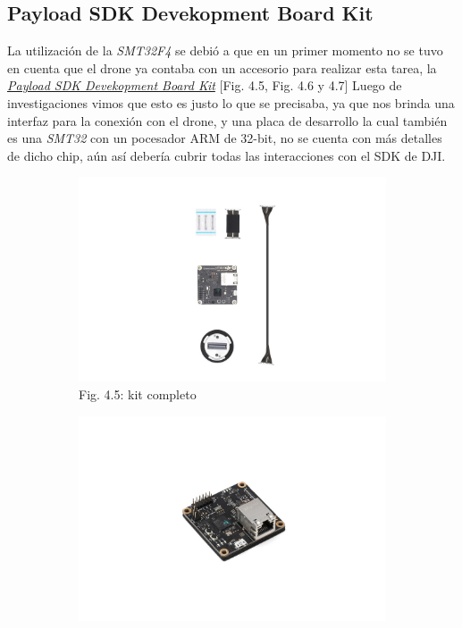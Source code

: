 \documentclass[12pt]{article}
\begin{document}
\subsection*{Payload SDK Devekopment Board Kit}
La utilización de la \textit{SMT32F4} se debió a que en un primer momento no se tuvo en cuenta que el drone ya contaba con un accesorio para realizar esta tarea, la \href{https://store.dji.com/product/psdk-development-kit}{\textit{Payload SDK Devekopment Board Kit}} [Fig. 4.5, Fig. 4.6 y 4.7]
Luego de investigaciones vimos que esto es justo lo que se precisaba, ya que nos brinda una interfaz para la conexión con el drone, y una placa de desarrollo la cual también es una \textit{SMT32} con un pocesador ARM de 32-bit, no se cuenta con más detalles de dicho chip, aún así debería cubrir todas las interacciones con el SDK de DJI.
\begin{figure}[ht]
  \centering
  \begin{subfigure}[b]{0.45\linewidth}
    \includegraphics[width=\linewidth]{images/Payload-DBK-1.jpg}
    \caption{Fig. 4.5: kit completo}
  \end{subfigure}
  \begin{subfigure}[b]{0.45\linewidth}
    \includegraphics[width=\linewidth]{images/Payload-DBK-2.jpg}

\end{subfigure}
\end{figure}
\end{document}
